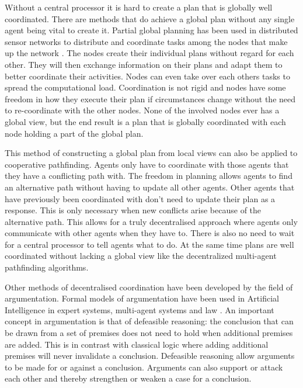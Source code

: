 Without a central processor it is hard to create a plan that is globally well
coordinated. There are methods that do achieve a global plan without any single
agent being vital to create it.
Partial global planning has been used in distributed sensor networks to
distribute and coordinate tasks among the nodes that make up the network
\cite{durfee1991}. The nodes create their individual plans without regard for
each other. They will then exchange information on their plans and adapt them
to better coordinate their activities. Nodes can even take over each others
tasks to spread the computational load. Coordination is not rigid and nodes have
some freedom in how they execute their plan if circumstances change without
the need to re-coordinate with the other nodes. None of the involved nodes ever
has a global view, but the end result is a plan that is globally coordinated
with each node holding a part of the global plan.

This method of constructing a global plan from local views can also be applied
to cooperative pathfinding. Agents only have to coordinate with those agents
that they have a conflicting path with. The freedom in planning allows agents
to find an alternative path without having to update all other agents. Other
agents that have previously been coordinated with don't need to update their
plan as a response. This is only necessary when new conflicts arise because of
the alternative path. This allows for a truly decentralised approach where
agents  only communicate with other agents when they have to. There is also no
need to wait for a central processor to tell agents what to do. At the same
time plans are well coordinated without lacking a global view like the
decentralized multi-agent pathfinding algorithms.

Other methods of decentralised coordination have been developed by the field of
argumentation. Formal models of argumentation have been used in Artificial
Intelligence in expert systems, multi-agent systems and law
\cite{vaneemeren2014}. An important concept in argumentation is that of
defeasible reasoning: the conclusion that can be drawn from a set of premises
does not need to hold when additional premises are added. This is in contrast
with classical logic where adding additional premises will never invalidate a
conclusion. Defeasible reasoning allow arguments to be made for or against a
conclusion. Arguments can also support or attack each other and thereby
strengthen or weaken a case for a conclusion.


